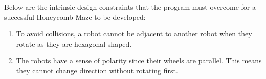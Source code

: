 Below are the intrinsic design constraints that the program must overcome for a successful Honeycomb Maze to be developed:
\begin{tcolorbox}
\begin{enumerate}
\item To avoid collisions, a robot cannot be adjacent to another robot when they rotate as they are hexagonal-shaped. 
\item The robots have a sense of polarity since their wheels are parallel. This means they cannot change direction without rotating first.
\end{enumerate}
\end{tcolorbox}


